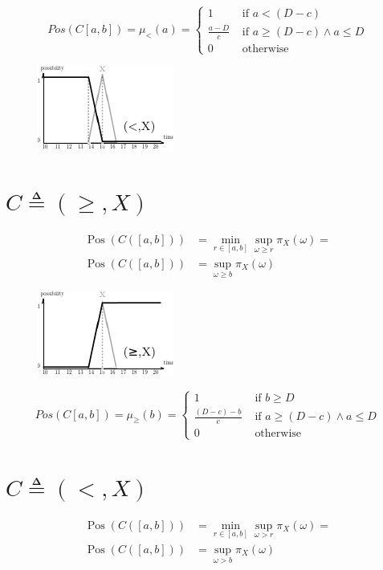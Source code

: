 \documentclass[10pt,a4paper]{article}
\newcommand{\Pos}{\operatorname{Pos}}
\begin{document}
\begin{equation}
Pos (C[a,b]) = \mu_{<}(a) =
\begin{cases}
1 & \mbox{ if } a < (D-c) \\
\frac{a-D}{c} & \mbox{ if } a \geq (D-c) \wedge a \leq D \\
0 & \mbox{ otherwise }
\end{cases}
\end{equation}

\begin{figure}[h]
\centering
\includegraphics[scale=1]{graphs/lt.pdf}
\end{figure}


\section*{$C\triangleq(\geq,X)$}
\begin{align}
\Pos (C([a,b])) &= \min_{r \in [a,b]} \sup_{\omega \geq r} \pi_X(\omega) = \\
\Pos (C([a,b])) &= \sup_{\omega \geq b} \pi_X(\omega)
\end{align}
\begin{figure}[h]
\centering
\includegraphics[scale=1]{graphs/gte.pdf}
\end{figure}

\begin{equation}
Pos (C[a,b]) = \mu_{\geq}(b) =
\begin{cases}
1 & \mbox{ if } b \geq D \\
\frac{(D-c)-b}{c} & \mbox{ if } a \geq (D-c) \wedge a \leq D \\
0 & \mbox{ otherwise }
\end{cases}
\end{equation}



\section*{$C\triangleq(<,X)$}
\begin{align}
\Pos (C([a,b])) &= \min_{r \in [a,b]} \sup_{\omega > r} \pi_X(\omega) = \\
\Pos (C([a,b])) &= \sup_{\omega > b} \pi_X(\omega)
\end{align}
\end{document}

